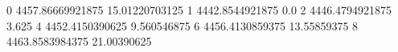 0 4457.86669921875 15.01220703125
1 4442.8544921875 0.0
2 4446.4794921875 3.625
4 4452.4150390625 9.560546875
6 4456.4130859375 13.55859375
8 4463.8583984375 21.00390625
